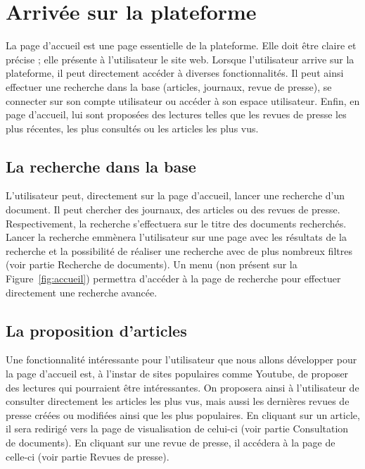 \section{Arrivée sur la plateforme}
\label{sec:arrivee}

La page d’accueil est une page essentielle de la plateforme. Elle doit être claire et précise ; elle présente à l’utilisateur le site web. Lorsque l’utilisateur arrive sur la plateforme, il peut directement accéder à diverses fonctionnalités. Il peut ainsi effectuer une recherche dans la base (articles, journaux, revue de presse), se connecter sur son compte utilisateur ou accéder à son espace utilisateur. Enfin,  en page d'accueil, lui sont proposées des lectures telles que les revues de presse les plus récentes, les plus consultés ou les articles les plus vus.

\subsection{La recherche dans la base}
\label{sec:arrivee_recherche}
L'utilisateur peut, directement sur la page d'accueil, lancer une recherche d'un document. Il peut chercher des journaux, des articles ou des revues de presse. Respectivement, la recherche s'effectuera sur le titre des documents recherchés. Lancer la recherche emmènera l'utilisateur sur une page avec les résultats de la recherche et la possibilité de réaliser une recherche avec de plus nombreux filtres (voir partie Recherche de documents). Un menu (non présent sur la Figure~\ref{fig:accueil}) permettra d'accéder à la page de recherche pour effectuer directement une recherche avancée.

\subsection{La proposition d’articles}
\label{sec:arrivee_article}
Une fonctionnalité intéressante pour l'utilisateur que nous allons développer pour la page d'accueil est, à l'instar de sites populaires comme Youtube, de proposer des lectures qui pourraient être intéressantes. On proposera ainsi à l'utilisateur de consulter directement les articles les plus vus, mais aussi les dernières revues de presse créées ou modifiées ainsi que les plus populaires. En cliquant sur un article, il sera redirigé vers la page de visualisation de celui-ci (voir partie Consultation de documents). En cliquant sur une revue de presse, il accédera à la page de celle-ci (voir partie Revues de presse).


